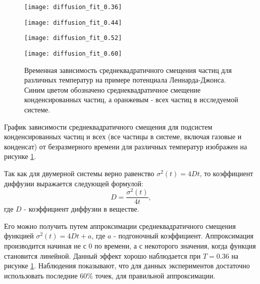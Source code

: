\begin{figure}[h]
\begin{center}
\begin{minipage}[h]{0.45\linewidth}
\texttt{[image: diffusion\_fit\_0.36]}
\end{minipage}
\begin{minipage}[h]{0.45\linewidth}
\texttt{[image: diffusion\_fit\_0.44]}
\end{minipage}


\begin{minipage}[h]{0.45\linewidth}
\texttt{[image: diffusion\_fit\_0.52]}
\end{minipage}
\begin{minipage}[h]{0.45\linewidth}
\texttt{[image: diffusion\_fit\_0.60]}
\end{minipage}
\caption{Временная зависимость среднеквадратичного смещения частиц для различных температур на примере потенциала Леннарда-Джонса. Синим цветом обозначено среднеквадратичное смещение конденсированных частиц,  а оранжевым - всех частиц в исследуемой системе.}
\label{risRMS}
\end{center}
\end{figure}

График зависимости среднеквадратичного смещения для подсистем конденсированных частиц и всех (все частицы в системе, включая газовые и конденсат) от безразмерного времени для различных температур изображен на рисунке \ref{risRMS}.

Так как для двумерной системы верно равенство $\sigma^2(t) = 4Dt$, то коэффициент диффузии выражается следующей формулой:
\begin{equation}
    D = \frac{\sigma^2(t)}{4t},
    \label{eqD}
\end{equation}
где $D$ - коэффициент диффузии в веществе.

Его можно получить путем аппроксимации среднеквадратичного смещения функцией $\sigma^2(t) = 4Dt + a$, где $a$ - подгоночный коэффициент. Аппроксимация производится начиная не с 0 по времени, а с некоторого значения, когда функция становится линейной. Данный эффект хорошо наблюдается при $T = 0.36$ на рисунке \ref{risRMS}. Наблюдения показывают, что для данных экспериментов достаточно использовать последние $60\%$ точек, для правильной аппроксимации.  

